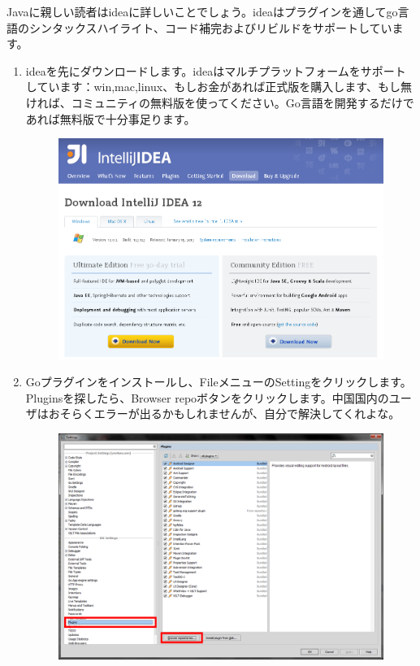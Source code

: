Javaに親しい読者はideaに詳しいことでしょう。ideaはプラグインを通してgo言語のシンタックスハイライト、コード補完およびリビルドをサポートしています。

\begin{enumerate}
  \item ideaを先にダウンロードします。ideaはマルチプラットフォームをサポートしています：win,mac,linux、もしお金があれば正式版を購入します、もし無ければ、コミュニティの無料版を使ってください。Go言語を開発するだけであれば無料版で十分事足ります。
    \begin{figure}[H]
      \includegraphics[width=14cm]{1.4.idea1.png}
    \end{figure}
  \item Goプラグインをインストールし、FileメニューのSettingをクリックします。Pluginsを探したら、Browser repoボタンをクリックします。中国国内のユーザはおそらくエラーが出るかもしれませんが、自分で解決してくれよな。
    \begin{figure}[H]
      \includegraphics[width=14cm]{1.4.idea3.png}

\end{figure}
\end{enumerate}

